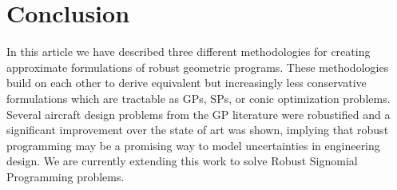 \section{Conclusion} \label{conc}
In this article we have described three different methodologies for creating approximate formulations of robust geometric programs. These methodologies build on each other to derive equivalent but increasingly less conservative formulations which are tractable as GPs, SPs, or conic optimization problems. Several aircraft design problems from the GP literature were robustified and a significant improvement over the state of art was shown, implying that robust programming may be a promising way to model uncertainties in engineering design. We are currently extending this work to solve Robust Signomial Programming problems.